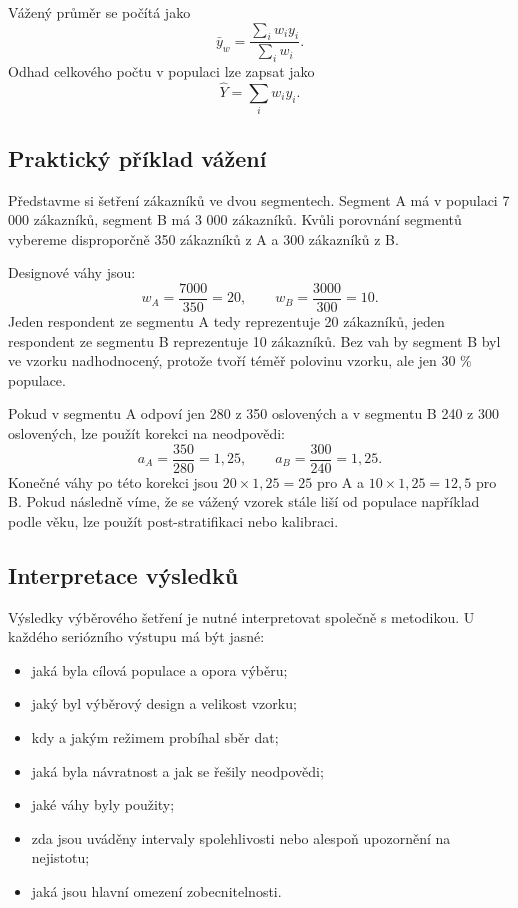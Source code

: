 Vážený průměr se počítá jako
\[
  \bar{y}_w = \frac{\sum_i w_i y_i}{\sum_i w_i}.
\]
Odhad celkového počtu v populaci lze zapsat jako
\[
  \hat{Y} = \sum_i w_i y_i.
\]

\subsection{Praktický příklad vážení}
Představme si šetření zákazníků ve dvou segmentech. Segment A má v populaci 7 000 zákazníků, segment B
má 3 000 zákazníků. Kvůli porovnání segmentů vybereme disproporčně 350 zákazníků z A a 300 zákazníků
z B.

Designové váhy jsou:
\[
  w_A = \frac{7000}{350} = 20, \qquad
  w_B = \frac{3000}{300} = 10.
\]
Jeden respondent ze segmentu A tedy reprezentuje 20 zákazníků, jeden respondent ze segmentu B
reprezentuje 10 zákazníků. Bez vah by segment B byl ve vzorku nadhodnocený, protože tvoří téměř
polovinu vzorku, ale jen 30 \% populace.

Pokud v segmentu A odpoví jen 280 z 350 oslovených a v segmentu B 240 z 300 oslovených, lze použít
korekci na neodpovědi:
\[
  a_A = \frac{350}{280} = 1{,}25, \qquad
  a_B = \frac{300}{240} = 1{,}25.
\]
Konečné váhy po této korekci jsou \(20 \times 1{,}25 = 25\) pro A a \(10 \times 1{,}25 = 12{,}5\)
pro B. Pokud následně víme, že se vážený vzorek stále liší od populace například podle věku, lze
použít post-stratifikaci nebo kalibraci.

\subsection{Interpretace výsledků}
Výsledky výběrového šetření je nutné interpretovat společně s metodikou. U každého seriózního výstupu
má být jasné:
\begin{itemize}
  \item jaká byla cílová populace a opora výběru;
  \item jaký byl výběrový design a velikost vzorku;
  \item kdy a jakým režimem probíhal sběr dat;
  \item jaká byla návratnost a jak se řešily neodpovědi;
  \item jaké váhy byly použity;
  \item zda jsou uváděny intervaly spolehlivosti nebo alespoň upozornění na nejistotu;
  \item jaká jsou hlavní omezení zobecnitelnosti.
\end{itemize}


